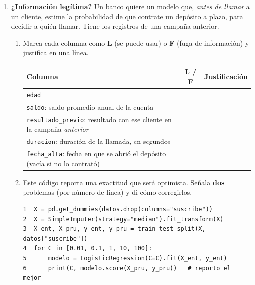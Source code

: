 \documentclass[11pt]{article}
\newcommand{\espacio}[1]{\par\vspace{#1}}
\newcommand{\nuevapagina}{\newpage}
\begin{document}
\begin{enumerate}
\begin{enumerate}
  \item Un compañero propone calcular la mediana, la media y la desviación con las siete casas (las de entrenamiento y las de prueba) «para tener más datos». ¿Qué problema tiene la propuesta?
  \espacio{2.5cm}
\end{enumerate}

\nuevapagina
\item \textbf{¿Información legítima?} Un banco quiere un modelo que, \emph{antes de llamar} a un cliente, estime la probabilidad de que contrate un depósito a plazo, para decidir a quién llamar. Tiene los registros de una campaña anterior.

\begin{enumerate}
  \item Marca cada columna como \textbf{L} (se puede usar) o \textbf{F} (fuga de información) y justifica en una línea.

  \begin{center}
  \renewcommand{\arraystretch}{1.6}
  \begin{tabular}{p{6cm}c p{7.6cm}}
  \toprule
  Columna & L / F & Justificación \\
  \midrule
  \texttt{edad} & & \\
  \texttt{saldo}: saldo promedio anual de la cuenta & & \\
  \texttt{resultado\_previo}: resultado con ese cliente en la campaña \emph{anterior} & & \\
  \texttt{duracion}: duración de la llamada, en segundos & & \\
  \texttt{fecha\_alta}: fecha en que se abrió el depósito (vacía si no lo contrató) & & \\
  \bottomrule
  \end{tabular}
  \end{center}

  \item Este código reporta una exactitud que será optimista. Señala \textbf{dos} problemas (por número de línea) y di cómo corregirlos.
\begin{verbatim}
1  X = pd.get_dummies(datos.drop(columns="suscribe"))
2  X = SimpleImputer(strategy="median").fit_transform(X)
3  X_ent, X_pru, y_ent, y_pru = train_test_split(X, datos["suscribe"])
4  for C in [0.01, 0.1, 1, 10, 100]:
5      modelo = LogisticRegression(C=C).fit(X_ent, y_ent)
6      print(C, modelo.score(X_pru, y_pru))   # reporto el mejor
\end{verbatim}
  \espacio{3.2cm}
\end{enumerate}


\end{enumerate}
\end{document}
